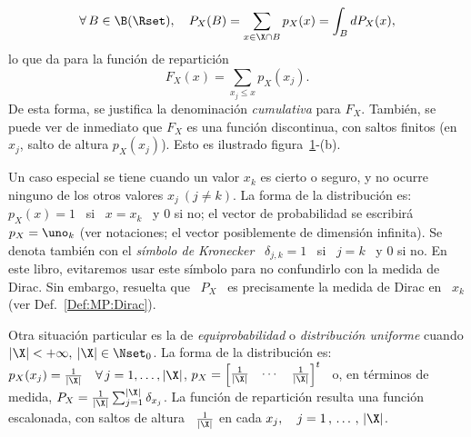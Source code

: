 %
\[
\forall \,  B \in  \B(\Rset), \quad  P_X(B) = \sum_{x  \in \X  \cap B}  p_X(x) =
\int_B dP_X(x),
\]
%
lo que da para la funci\'on de repartici\'on
%
\[
F_X(x) = \sum_{x_j \le x} p_X(x_j).
\]
%
De  esta forma,  se justifica  la  denominaci\'on {\it  cumulativa} para  $F_X$.
Tambi\'en, se puede ver de inmediato que $F_X$ es una funci\'on discontinua, con
saltos  finitos (en  $x_j$,  salto  de altura  $p_X(x_j)$).   Esto es  ilustrado
figura~\ref{Fig:MP:ProbaDiscreta}-(b).

\begin{figure}[h!]
\begin{center}  \end{center}
%
\label{Fig:MP:ProbaDiscreta}
\end{figure}

Un caso especial se tiene cuando un  valor $x_k$ es cierto o seguro, y no ocurre
ninguno de los  otros valores $x_j \  (j \ne k)$. La forma  de la distribuci\'on
es: \ $p_X(x) = 1$ \ si \ $x =  x_k$ \ y $0$ si no; el vector de probabilidad se
escribir\'a  \  $p_X  =  \uno_k$  (ver  notaciones;  el  vector  posiblemente  de
dimensi\'on infinita).  Se denota tambi\'en  con el {\it s\'imbolo de Kronecker}
\ $\delta_{j,k} = 1$ \  si \ $j = k$ \ y 0 si  no. En este libro, evitaremos usar
este  s\'imbolo  para no  confundirlo  con la  medida  de  Dirac.  Sin  embargo,
resuelta  que \  $P_X$ \  es precisamente  la medida  de Dirac  en \  $x_k$ (ver
Def.~\ref{Def:MP:Dirac}).


Otra   situaci\'on  particular   es  la   de  {\it   equiprobabilidad}   o  {\it
  distribuci\'on  uniforme} cuando  $|\X| <  +\infty,  \: |\X|  \in
\Nset_0$.  La  forma de la distribuci\'on  es: \ $p_X(x_j)  = \frac{1}{|\X|} \quad
\forall \, j =  1 , \ldots , |\X|$, \ie $p_X  = \begin{bmatrix} \frac{1}{|\X|} &
  \cdots &  \frac{1}{|\X|} \end{bmatrix}^t$ \ o,  en t\'erminos de  medida, $P_X =
\frac{1}{|\X|}  \sum_{j=1}^{|\X|} \delta_{x_j}$.   La  funci\'on de  repartici\'on
resulta una funci\'on escalonada, con  saltos de altura \ $\frac{1}{|\X|}$ en cada
$x_j, \quad j = 1 \, , \, \ldots \, , \, |\X|$.

